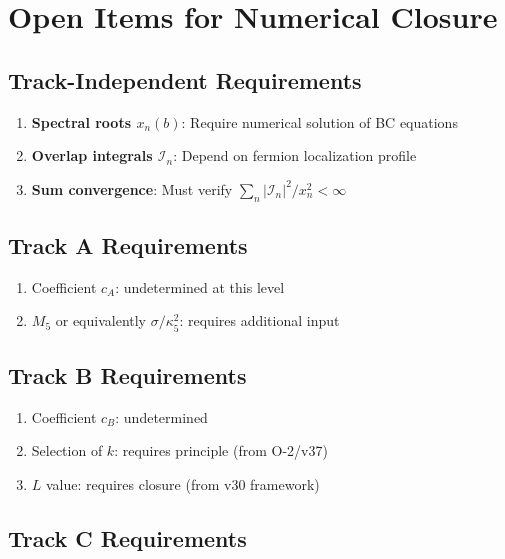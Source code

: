 \documentclass[11pt,a4paper]{article}
\begin{document}
\section{Open Items for Numerical Closure}

\subsection{Track-Independent Requirements}

\begin{enumerate}
    \item \textbf{Spectral roots $x_n(b)$}: Require numerical solution of BC equations
    \item \textbf{Overlap integrals $\mathcal{I}_n$}: Depend on fermion localization profile
    \item \textbf{Sum convergence}: Must verify $\sum_n |\mathcal{I}_n|^2/x_n^2 < \infty$
\end{enumerate}

\subsection{Track A Requirements}

\begin{enumerate}
    \item Coefficient $c_A$: undetermined at this level
    \item $M_5$ or equivalently $\sigma/\kappa_5^2$: requires additional input
\end{enumerate}

\subsection{Track B Requirements}

\begin{enumerate}
    \item Coefficient $c_B$: undetermined
    \item Selection of $k$: requires principle (from O-2/v37)
    \item $L$ value: requires closure (from v30 framework)
\end{enumerate}

\subsection{Track C Requirements}
\end{document}
